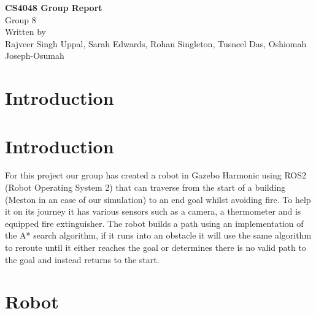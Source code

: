 \documentclass[12pt,a4paper,twoside]{article}
\begin{document}
\onecolumn
\begin{titlepage}
    \centering

    \vspace{2cm}

    {\Huge \textbf{CS4048 Group Report}}\\[1cm]

    {\Large Group 8}\\[2cm]

    {\large Written by}\\[0.3cm]
    {\Large Rajveer Singh Uppal, Sarah Edwards, Rohan Singleton, Tusneel Das, Oshiomah Joseph-Osumah  }\\[1cm]

    \vfill

\end{titlepage}


\tableofcontents

\clearpage


\twocolumn


\section{Introduction}

\section{Introduction}

For this project our group has created a robot
in Gazebo Harmonic \cite{gazebodocs} using ROS2 (Robot Operating System 2) \cite{ros2} that can traverse from the
start of a building (Meston in an case of our simulation) to an end goal
whilst avoiding fire. To help it on its journey
it has various sensors such as a camera, a thermometer
and is equipped fire extinguisher. The robot builds a path using an implementation of the A* 
search algorithm, if it runs into an obstacle it 
will use the same algorithm to reroute until it either 
reaches the goal or determines there is no valid path 
to the goal and instead returns to the start.

\section{Robot}
\end{document}
